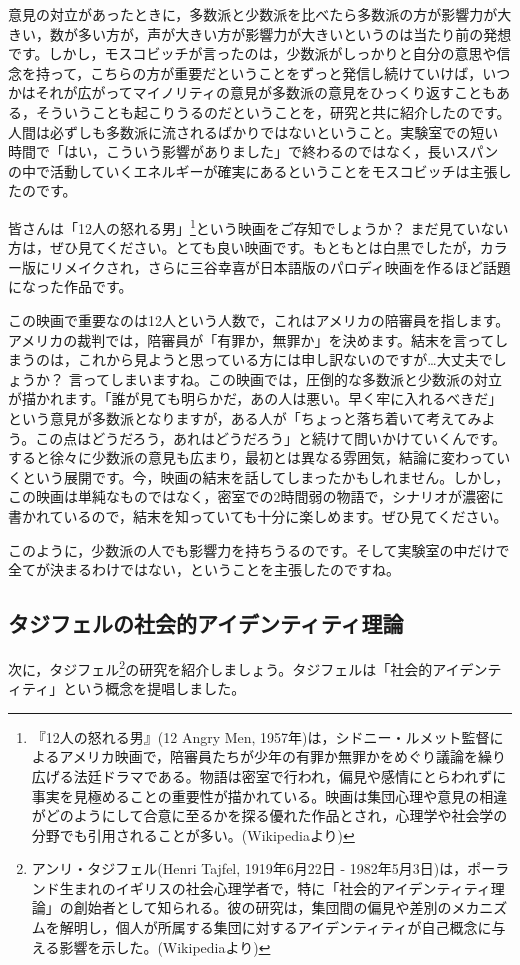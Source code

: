 \documentclass{ltjsbook}
\begin{document}
意見の対立があったときに，多数派と少数派を比べたら多数派の方が影響力が大きい，数が多い方が，声が大きい方が影響力が大きいというのは当たり前の発想です。しかし，モスコビッチが言ったのは，少数派がしっかりと自分の意思や信念を持って，こちらの方が重要だということをずっと発信し続けていけば，いつかはそれが広がってマイノリティの意見が多数派の意見をひっくり返すこともある，そういうことも起こりうるのだということを，研究と共に紹介したのです。人間は必ずしも多数派に流されるばかりではないということ。実験室での短い時間で「はい，こういう影響がありました」で終わるのではなく，長いスパンの中で活動していくエネルギーが確実にあるということをモスコビッチは主張したのです。

皆さんは「12人の怒れる男」\footnote{『12人の怒れる男』(12 Angry Men, 1957年)は，シドニー・ルメット監督によるアメリカ映画で，陪審員たちが少年の有罪か無罪かをめぐり議論を繰り広げる法廷ドラマである。物語は密室で行われ，偏見や感情にとらわれずに事実を見極めることの重要性が描かれている。映画は集団心理や意見の相違がどのようにして合意に至るかを探る優れた作品とされ，心理学や社会学の分野でも引用されることが多い。(Wikipediaより)}という映画をご存知でしょうか？ まだ見ていない方は，ぜひ見てください。とても良い映画です。もともとは白黒でしたが，カラー版にリメイクされ，さらに三谷幸喜が日本語版のパロディ映画を作るほど話題になった作品です。

この映画で重要なのは12人という人数で，これはアメリカの陪審員を指します。アメリカの裁判では，陪審員が「有罪か，無罪か」を決めます。結末を言ってしまうのは，これから見ようと思っている方には申し訳ないのですが…大丈夫でしょうか？ 言ってしまいますね。この映画では，圧倒的な多数派と少数派の対立が描かれます。「誰が見ても明らかだ，あの人は悪い。早く牢に入れるべきだ」という意見が多数派となりますが，ある人が「ちょっと落ち着いて考えてみよう。この点はどうだろう，あれはどうだろう」と続けて問いかけていくんです。すると徐々に少数派の意見も広まり，最初とは異なる雰囲気，結論に変わっていくという展開です。今，映画の結末を話してしまったかもしれません。しかし，この映画は単純なものではなく，密室での2時間弱の物語で，シナリオが濃密に書かれているので，結末を知っていても十分に楽しめます。ぜひ見てください。

このように，少数派の人でも影響力を持ちうるのです。そして実験室の中だけで全てが決まるわけではない，ということを主張したのですね。

\subsection{タジフェルの社会的アイデンティティ理論}
次に，タジフェル\footnote{アンリ・タジフェル(Henri Tajfel, 1919年6月22日 - 1982年5月3日)は，ポーランド生まれのイギリスの社会心理学者で，特に「社会的アイデンティティ理論」の創始者として知られる。彼の研究は，集団間の偏見や差別のメカニズムを解明し，個人が所属する集団に対するアイデンティティが自己概念に与える影響を示した。(Wikipediaより)}の研究を紹介しましょう。タジフェルは「社会的アイデンティティ」という概念を提唱しました。
\end{document}

